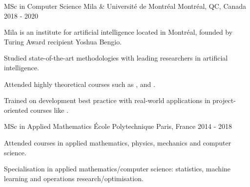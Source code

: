 \begin{cventries}
    \cventry
    {MSc in Computer Science} %
    {Mila \& Université de Montréal} %
    {Montréal, QC, Canada} %
    {2018 - 2020} %
    {
            Mila is an institute for artificial intelligence located in Montréal, founded by Turing Award recipient Yoshua Bengio.
        \vspace{4.5mm}
        \begin{cvitems}
            \item Studied state-of-the-art methodologies with leading researchers in artificial intelligence.
            \item Attended highly theoretical courses such as ,  and .
            \item Trained on development best practice with real-world applications in project-oriented courses like .
        \end{cvitems}
    }

    \cventry
    {MSc in Applied Mathematics} %
    {École Polytechnique} %
    {Paris, France} %
    {2014 - 2018} %
    {
        \begin{cvitems} %
        \item Attended courses in applied mathematics, physics, mechanics and computer science.
        \item Specialisation in applied mathematics/computer science: statistics, machine learning and operations research/optimisation.
      \end{cvitems}
    }




\end{cventries}
